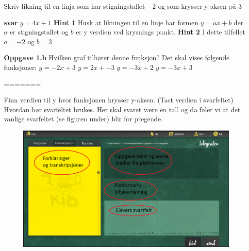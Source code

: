\documentclass[12pt,twoside,onecolumn]{article}
\begin{document}
Skriv likning til en linja som har stigningstallet $-2$ og som krysser y aksen på $3$

\textbf{svar}  
$y=4x+1$
\textbf{Hint 1}
Husk at likningen til en linje har formen $y=ax+b$ der $a$ er stigningstallet og $b$ er y verdien ved krysnings punkt.
\textbf{Hint 2}
I dette tilfellet $a=-2$ og $b=3$

\textbf{Oppgave 1.b} Hvilken graf tilhører denne funksjon? 
\newline
{\color{Maroon}Det skal vises følgende funksjoner:
$y=-2x+3$
\newline
$y=2x+-3$
\newline
$y=-3x+2$
\newline
$y=-3x+3$
\newline
}
\newline\newline


 

=======
\begin{Exercise}
Finn verdien til y hvor funksjonen krysser y-aksen. (Tast verdien i svarfeltet) {\color{Cerulean} Hvordan bør svarfeltet brukes. Her skal svaret være en tall og da føler vi at det vanlige svarfeltet (se figuren under) blir for pregende.}
\begin{figure}[h!]
\centering
\includegraphics[scale = 0.3]{figures/Platform_explained.png}
\end{figure}
\end{Exercise}
\end{document}
